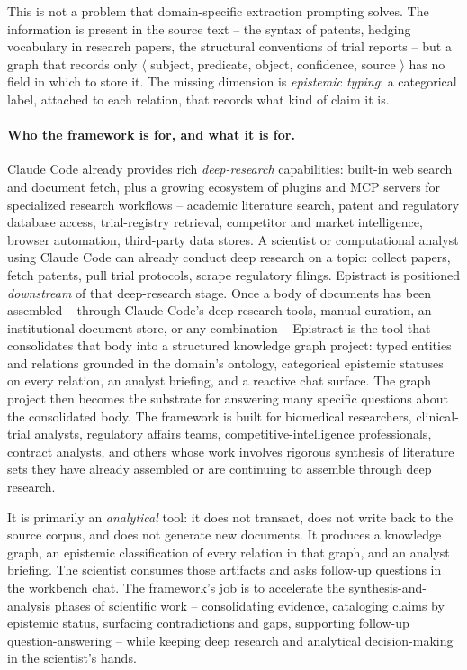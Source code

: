 This is not a problem that domain-specific extraction prompting solves. The information is present in the source text -- the syntax of patents, hedging vocabulary in research papers, the structural conventions of trial reports -- but a graph that records only $\langle$ subject, predicate, object, confidence, source $\rangle$ has no field in which to store it. The missing dimension is \emph{epistemic typing}: a categorical label, attached to each relation, that records what kind of claim it is.

\paragraph{Who the framework is for, and what it is for.} Claude Code already provides rich \emph{deep-research} capabilities: built-in web search and document fetch, plus a growing ecosystem of plugins and MCP servers for specialized research workflows -- academic literature search, patent and regulatory database access, trial-registry retrieval, competitor and market intelligence, browser automation, third-party data stores. A scientist or computational analyst using Claude Code can already conduct deep research on a topic: collect papers, fetch patents, pull trial protocols, scrape regulatory filings. Epistract is positioned \emph{downstream} of that deep-research stage. Once a body of documents has been assembled -- through Claude Code's deep-research tools, manual curation, an institutional document store, or any combination -- Epistract is the tool that consolidates that body into a structured knowledge graph project: typed entities and relations grounded in the domain's ontology, categorical epistemic statuses on every relation, an analyst briefing, and a reactive chat surface. The graph project then becomes the substrate for answering many specific questions about the consolidated body. The framework is built for biomedical researchers, clinical-trial analysts, regulatory affairs teams, competitive-intelligence professionals, contract analysts, and others whose work involves rigorous synthesis of literature sets they have already assembled or are continuing to assemble through deep research.

It is primarily an \emph{analytical} tool: it does not transact, does not write back to the source corpus, and does not generate new documents. It produces a knowledge graph, an epistemic classification of every relation in that graph, and an analyst briefing. The scientist consumes those artifacts and asks follow-up questions in the workbench chat. The framework's job is to accelerate the synthesis-and-analysis phases of scientific work -- consolidating evidence, cataloging claims by epistemic status, surfacing contradictions and gaps, supporting follow-up question-answering -- while keeping deep research and analytical decision-making in the scientist's hands.


